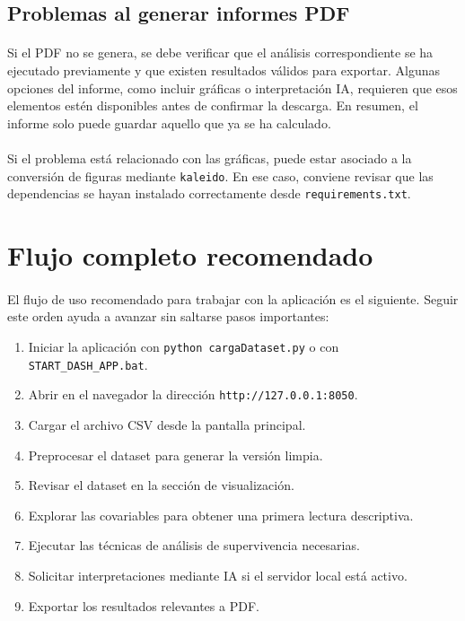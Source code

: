 \subsection{Problemas al generar informes PDF}

\paragraph*{}Si el PDF no se genera, se debe verificar que el análisis correspondiente se ha ejecutado previamente y que existen resultados válidos para exportar. Algunas opciones del informe, como incluir gráficas o interpretación IA, requieren que esos elementos estén disponibles antes de confirmar la descarga. En resumen, el informe solo puede guardar aquello que ya se ha calculado.

\paragraph*{}Si el problema está relacionado con las gráficas, puede estar asociado a la conversión de figuras mediante \texttt{kaleido}. En ese caso, conviene revisar que las dependencias se hayan instalado correctamente desde \texttt{requirements.txt}.

\section{Flujo completo recomendado}

\paragraph*{}El flujo de uso recomendado para trabajar con la aplicación es el siguiente. Seguir este orden ayuda a avanzar sin saltarse pasos importantes:

\begin{enumerate}
    \item Iniciar la aplicación con \texttt{python cargaDataset.py} o con \texttt{START\_DASH\_APP.bat}.
    \item Abrir en el navegador la dirección \texttt{http://127.0.0.1:8050}.
    \item Cargar el archivo CSV desde la pantalla principal.
    \item Preprocesar el dataset para generar la versión limpia.
    \item Revisar el dataset en la sección de visualización.
    \item Explorar las covariables para obtener una primera lectura descriptiva.
    \item Ejecutar las técnicas de análisis de supervivencia necesarias.
    \item Solicitar interpretaciones mediante IA si el servidor local está activo.
    \item Exportar los resultados relevantes a PDF.
\end{enumerate}

